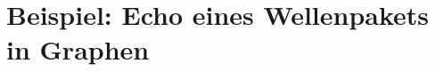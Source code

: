 \documentclass{beamer}
\begin{document}
\section{Beispiel: Echo eines Wellenpakets in Graphen}



















\end{document}
